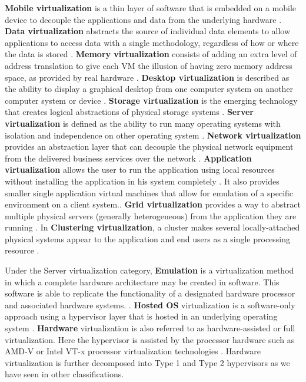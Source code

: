     
    \textbf{Mobile virtualization} is a thin layer of software that is embedded on a mobile device to decouple the applications and data from the underlying hardware \cite{Ameen2013, VMware2018Website}. \textbf{Data virtualization} abstracts the source of individual data elements to allow applications to access data with a single methodology, regardless of how or where the data is stored \cite{Mann2006}. \textbf{Memory virtualization} consists of adding an extra level of address translation to give each VM the illusion of having zero memory address space, as provided by real hardware \cite{Ameen2013, Waldspurger2002}. \textbf{Desktop virtualization} is described as the ability to display a graphical desktop from one computer system on another computer system or device \cite{Ameen2013, VonHagen2008}. \textbf{Storage virtualization} is the emerging technology that creates logical abstractions of physical storage systems \cite{Ameen2013, Bigang2005}. \textbf{Server virtualization} is defined as the ability to run many operating systems with isolation and independence on other operating system \cite{Ameen2013}.
    \textbf{Network virtualization} provides an abstraction layer that can decouple the physical network equipment from the delivered business services over the network \cite{Annapareddy2011}. \textbf{Application virtualization} allows the user to run the application using local resources without installing the application in his system completely \cite{Annapareddy2011}. It also provides smaller single application virtual machines that allow for emulation of a specific environment on a client system.\cite{White2010}. \textbf{Grid virtualization} provides a way to abstract multiple physical servers (generally heterogeneous) from the application they are running \cite{Mann2006}. In \textbf{Clustering virtualization}, a cluster makes several locally-attached physical systems appear to the application and end users as a single processing resource \cite{Ameen2013, Mann2006}.
    
    Under the Server virtualization category,  \textbf{Emulation} is a virtualization method in which a complete hardware architecture may be created in software. This software is able to replicate the functionality of a designated hardware processor and associated hardware systems. \cite{Mann2006, Chiueh2005, VonHagen2008}.    \textbf{Hosted OS} virtualization is a software-only approach using a hypervisor layer that is hosted in an underlying operating system \cite{Ameen2013, VonHagen2008}. \textbf{Hardware} virtualization  is also referred to as hardware-assisted or full virtualization. Here the hypervisor is assisted by the processor hardware such as AMD-V or Intel VT-x processor virtualization technologies \cite{Ameen2013, VonHagen2008}. Hardware virtualization is further decomposed into  Type 1 and Type 2 hypervisors as we have seen in other classifications. 

